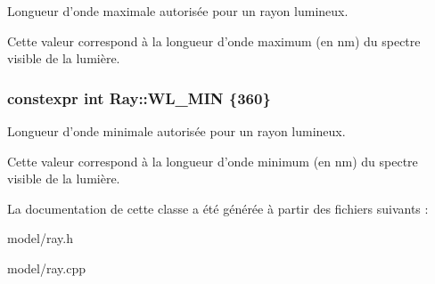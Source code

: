 Longueur d'onde maximale autorisée pour un rayon lumineux. 

Cette valeur correspond à la longueur d'onde maximum (en nm) du spectre visible de la lumière. \hypertarget{classRay_afecf2fa5a603689c3e77cbefbe08ffb1}{
\subsubsection[{W\+L\+\_\+\+M\+I\+N}]{\setlength{\rightskip}{0pt plus 5cm}constexpr int Ray\+::\+W\+L\+\_\+\+M\+I\+N \{360\}\hspace{0.3cm}{\ttfamily [static]}}}\label{classRay_afecf2fa5a603689c3e77cbefbe08ffb1}


Longueur d'onde minimale autorisée pour un rayon lumineux. 

Cette valeur correspond à la longueur d'onde minimum (en nm) du spectre visible de la lumière. 

La documentation de cette classe a été générée à partir des fichiers suivants \+:\begin{DoxyCompactItemize}
\item 
model/ray.\+h\item 
model/ray.\+cpp\end{DoxyCompactItemize}
